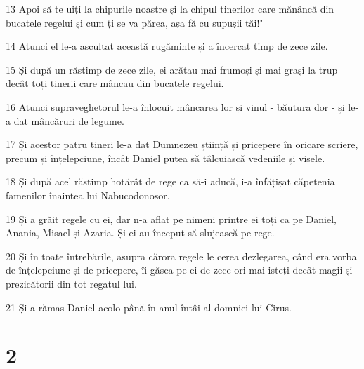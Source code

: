 \par 13 Apoi să te uiți la chipurile noastre și la chipul tinerilor care mănâncă din bucatele regelui și cum ți se va părea, așa fă cu supușii tăi!"
\par 14 Atunci el le-a ascultat această rugăminte și a încercat timp de zece zile.
\par 15 Și după un răstimp de zece zile, ei arătau mai frumoși și mai grași la trup decât toți tinerii care mâncau din bucatele regelui.
\par 16 Atunci supraveghetorul le-a înlocuit mâncarea lor și vinul - băutura dor - și le-a dat mâncăruri de legume.
\par 17 Și acestor patru tineri le-a dat Dumnezeu știință și pricepere în oricare scriere, precum și înțelepciune, încât Daniel putea să tâlcuiască vedeniile și visele.
\par 18 Și după acel răstimp hotărât de rege ca să-i aducă, i-a înfățișat căpetenia famenilor înaintea lui Nabucodonosor.
\par 19 Și a grăit regele cu ei, dar n-a aflat pe nimeni printre ei toți ca pe Daniel, Anania, Misael și Azaria. Și ei au început să slujească pe rege.
\par 20 Și în toate întrebările, asupra cărora regele le cerea dezlegarea, când era vorba de înțelepciune și de pricepere, îi găsea pe ei de zece ori mai isteți decât magii și prezicătorii din tot regatul lui.
\par 21 Și a rămas Daniel acolo până în anul întâi al domniei lui Cirus.

\chapter{2}

